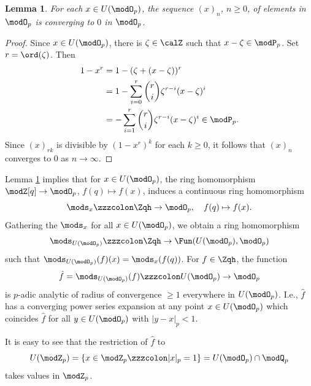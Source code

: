\documentclass{amsart}
\numberwithin{equation}{section}
\numberwithin{figure}{section}
\theoremstyle{plain}
\newtheorem{lemma}[theorem]{Lemma}
\theoremstyle{definition}
\theoremstyle{remark}
\begin{document}
\begin{lemma}
  \label{r46}
  For each $x\in U(\modO _p)$, the sequence $(x)_n$, $n\ge 0$, of elements in
  $\modO _p$ is converging to $0$ in $\modO _p$.
\end{lemma}

\begin{proof}
  Since $x\in U(\modO _p)$, there is $\zeta \in \calZ$ such that $x-\zeta \in \modP _p$.
  Set $r=\ord(\zeta )$.  Then
  \begin{equation*}
    \begin{split}
    1-x^r &= 1-(\zeta +(x-\zeta ))^r\\
    &=1-\sum_{i=0}^r\binom{r}{i}\zeta ^{r-i}(x-\zeta )^i\\
    &=-\sum_{i=1}^r\binom{r}{i}\zeta ^{r-i}(x-\zeta )^i\in \modP _p.
    \end{split}
  \end{equation*}
  Since $(x)_{rk}$ is divisible by $(1-x^r)^k$ for each $k\ge 0$, it
  follows that $(x)_n$ converges to $0$ as $n\rightarrow \infty $.
\end{proof}

Lemma \ref{r46} implies that for $x\in U(\modO _p)$, the ring homomorphism
$\modZ [q]\rightarrow \modO _p$, $f(q)\mapsto f(x)$, induces a continuous ring
homomorphism
\begin{equation*}
  \mods _x\zzzcolon \Zqh \rightarrow  \modO _p, \quad f(q)\mapsto f(x).
\end{equation*}
Gathering the $\mods _x$ for all $x\in U(\modO _p)$, we obtain a ring
homomorphism
\begin{equation*}
  \mods _{U(\modO _p)}\zzzcolon \Zqh \rightarrow  \Fun(U(\modO _p),\modO _p)
\end{equation*}
such that $\mods _{U(\modO _p)}(f)(x)=\mods _x(f(q))$.  For $f\in \Zqh$, the function
\begin{equation}
  \label{e79}
  \hat{f}=\mods _{U(\modO _p)}(f)\zzzcolon U(\modO _p)\rightarrow \modO _p
\end{equation}
is $p$-adic analytic of radius of convergence $\ge 1$ everywhere in
$U(\modO _p)$.  I.e., $\hat{f}$ has a converging power series expansion at
any point $x\in U(\modO _p)$ which coincides $\hat{f}$ for all $y\in U(\modO _p)$
with $|y-x|_p<1$.

It is easy to see that the restriction of $\hat{f}$ to
\begin{equation*}
  U(\modZ _p)=\{x\in \modZ _p\zzzcolon |x|_p=1\}=U(\modO _p)\cap \modQ _p
\end{equation*}
takes values in $\modZ _p$.
\end{document}
